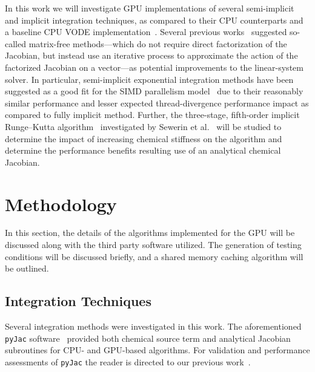 \documentclass[preprint]{elsarticle}
\begin{document}
In this work we will investigate GPU implementations of several semi-implicit and implicit integration techniques, as compared to their CPU counterparts and a baseline CPU VODE implementation~\cite{Hindmarsh:2005hg}.
Several previous works~\cite{Stone:2013aa,Bisetti:2012jw,Niemeyer:2014aa,Perini20141180,McNenly2015581} suggested so-called matrix-free methods---which do not require direct factorization of the Jacobian, but instead use an iterative process to approximate the action of the factorized Jacobian on a vector---as potential improvements to the linear-system solver.
In particular, semi-implicit exponential integration methods have been suggested as a good fit for the SIMD parallelism model~\cite{Stone:2013aa,Bisetti:2012jw,Niemeyer:2014aa} due to their reasonably similar performance and lesser expected thread-divergence performance impact as compared to fully implicit method.
Further, the three-stage, fifth-order implicit Runge--Kutta algorithm~\cite{hairer1996solving} investigated by Sewerin et al.~\cite{Sewerin20151375} will be studied to determine the impact of increasing chemical stiffness on the algorithm and determine the performance benefits resulting use of an analytical chemical Jacobian.

\section{Methodology}
\label{sec:Method}

In this section, the details of the algorithms implemented for the GPU will be discussed along with the third party software utilized.
The generation of testing conditions will be discussed briefly, and a shared memory caching algorithm will be outlined.

\subsection{Integration Techniques}

Several integration methods were investigated in this work.
The aforementioned \texttt{pyJac} software~\cite{Niemeyer:2015im} provided both chemical source term and analytical Jacobian subroutines for CPU- and GPU-based algorithms.
For validation and performance assessments of \texttt{pyJac} the reader is directed to our previous work~\cite{Niemeyer:2015ws}.
\end{document}
